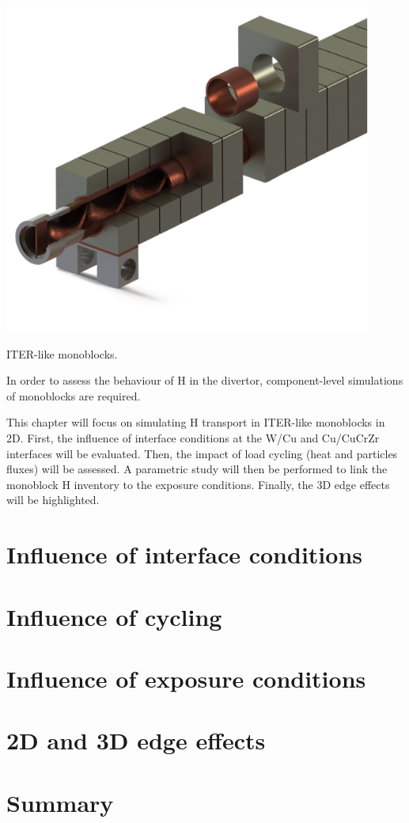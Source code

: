 \begin{marginfigure}
    \centering
    \includegraphics[width=\linewidth]{Figures/Chapter3/monoblocks_with_pipe.png}
    \caption{ITER-like monoblocks.}
    \label{fig: monoblocks with pipe}
\end{marginfigure}

In order to assess the behaviour of H in the divertor, component-level simulations of monoblocks are required.

This chapter will focus on simulating H transport in ITER-like monoblocks in 2D.
First, the influence of interface conditions at the W/Cu and Cu/CuCrZr interfaces will be evaluated.
Then, the impact of load cycling (heat and particles fluxes) will be assessed.
A parametric study will then be performed to link the monoblock H inventory to the exposure conditions.
Finally, the 3D edge effects will be highlighted.


\section{Influence of interface conditions}

\section{Influence of cycling}
\section{Influence of exposure conditions}

\section{2D and 3D edge effects} \label{3D edge effects}
\section{Summary}